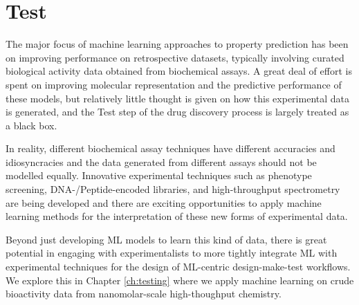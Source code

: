 \section*{Test}
The major focus of machine learning approaches to property prediction has been on improving performance on retrospective datasets, typically involving curated biological activity data obtained from biochemical assays. A great deal of effort is spent on improving molecular representation and the predictive performance of these models, but relatively little thought is given on how this experimental data is generated, and the Test step of the drug discovery process is largely treated as a black box. 

In reality, different biochemical assay techniques have different accuracies and idiosyncracies and the data generated from different assays should not be modelled equally. Innovative experimental techniques such as phenotype screening, DNA-/Peptide-encoded libraries, and high-throughput spectrometry are being developed and there are exciting opportunities to apply machine learning methods for the interpretation of these new forms of experimental data.

Beyond just developing ML models to learn this kind of data, there is great potential in engaging with experimentalists to more tightly integrate ML with experimental techniques for the design of ML-centric design-make-test workflows. We explore this in Chapter \ref{ch:testing} where we apply machine learning on crude bioactivity data from nanomolar-scale high-thoughput chemistry.
